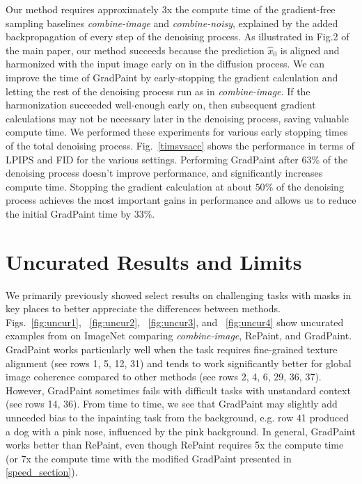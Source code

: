 Our method requires approximately 3x the compute time of the  gradient-free sampling baselines \emph{combine-image} and \emph{combine-noisy}, explained by the added backpropagation of every step of the denoising process. As illustrated in Fig.2 of the main paper, our method succeeds because the prediction $\hat{x}_0$ is aligned and harmonized with the input image early on in the diffusion process. We can improve the time of GradPaint by early-stopping the gradient calculation and letting the rest of the denoising process run as in \emph{combine-image}. If the harmonization succeeded well-enough early on, then subsequent gradient calculations may not be necessary later in the denoising process, saving valuable compute time. We performed these experiments for various early stopping times of the total denoising process. Fig.~\ref{timsvsacc} shows the performance in terms of LPIPS and FID for the various settings. Performing GradPaint after $63\%$ of the denoising process doesn't improve performance, and significantly increases compute time. Stopping the gradient calculation at about $50\%$ of the denoising process achieves the most important gains in performance and allows us to reduce the initial GradPaint time by $33\%$.


\section{Uncurated Results and Limits}

We primarily previously showed select results on challenging tasks with masks in key places to better appreciate the differences between methods. Figs.~\ref{fig:uncur1}, ~\ref{fig:uncur2}, ~\ref{fig:uncur3}, and ~\ref{fig:uncur4} show uncurated examples from on ImageNet comparing \emph{combine-image}, RePaint, and GradPaint. GradPaint works particularly well when the task requires fine-grained texture alignment (see rows 1, 5, 12, 31)  and tends to work significantly better for global image coherence compared to other methods (see rows 2, 4, 6, 29, 36, 37). However, GradPaint sometimes fails with difficult tasks with unstandard context (see rows 14, 36). From time to time, we see that GradPaint may slightly add unneeded bias to the inpainting task from the background, e.g. row 41 produced a dog with a pink nose, influenced by the pink background. In general, GradPaint works better than RePaint, even though RePaint requires 5x the compute time (or 7x the compute time with the modified GradPaint presented in \ref{speed_section}).


